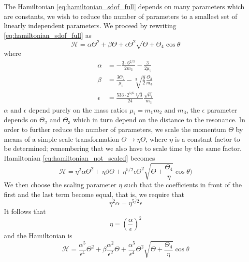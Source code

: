 \documentclass[twoside,openright,titlepage,numbers=noenddot,headinclude,%
                footinclude=true,cleardoublepage=empty,abstractoff, 
                BCOR=5mm,paper=a4,fontsize=11pt,%
                american,%
                ]{scrreprt}%
\begin{document}
The Hamiltonian \ref{eq:hamiltonian_sdof_full} depends on many parameters
which are constants, we wish to reduce the number of parameters to a 
smallest set of linearly independent parameters. We proceed by rewriting
\cref{eq:hamiltonian_sdof_full} as
\begin{equation}
    \mathcal{H}=\alpha\Theta^2+\beta\Theta +\epsilon\Theta^2\sqrt{\Theta+\Theta_4}
    \cos\theta
    \label{eq:hamiltonian_not_scaled}
\end{equation}
where
\begin{equation}
    \begin{aligned}
        \alpha&= - \frac{3\cdot 6^{2/3}}{2m_3} - \frac{3}{2\mu_i}\\
        \beta&=\frac{3\Theta_2 }{\mu_i}
          -\sqrt[3]{\frac{9}{2}}\frac{\Theta_3}{m_3} \\
         \epsilon&=\frac{533\cdot 2^{5/6}\sqrt[3]{3}}{24} 
        \frac{\sqrt{\mu_i}}{m_3}    
    \end{aligned}
\end{equation}
$\alpha$ and $\epsilon$ depend purely on the mass ratios $\mu_i=m_1m_2$ and
$m_3$, the $\epsilon$ parameter depends on $\Theta_2$ and $\Theta_3$ which in
turn depend on the distance to the resonance. In order to further reduce the 
number of parameters, we scale the momentum $\Theta$ by means of a 
simple scale transformation $\Theta\rightarrow\eta\Theta$, where
$\eta$ is a constant factor to be determined;
remembering that we also have to scale time by the same factor. 
Hamiltonian \ref{eq:hamiltonian_not_scaled} becomes
\begin{equation}
    \mathcal{H}=\eta^2\alpha\Theta^2+\eta\beta\Theta +
    \eta^{5/2}\epsilon\Theta^2\sqrt{\Theta+ \frac{\Theta_4}{\eta}}
    \cos\theta)
\end{equation}
We then choose the scaling parameter $\eta$ such that the coefficients
in front of the first and the last term become equal, that is,
we require that 
\begin{equation}
    \eta^2\alpha=\eta^{5/2}\epsilon
\end{equation}
It follows that 
\begin{equation}
    \eta=\left( \frac{\alpha}{\epsilon} \right)^2
\end{equation}
and the Hamiltonian is
  \begin{equation}
    \mathcal{H}= \frac{\alpha^5}{\epsilon^4} \Theta^2+
      \beta \frac{\alpha^2}{\epsilon^2} \Theta +
    \frac{\alpha^5}{\epsilon^4} \Theta^2\sqrt{\Theta+ \frac{\Theta_4}{\eta}}
    \cos\theta
\end{equation}
\end{document}
